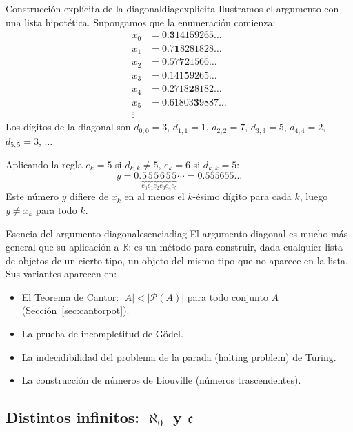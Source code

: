 \begin{ejemplo}{Construcción explícita de la diagonal}{diagexplicita}
Ilustramos el argumento con una lista hipotética. Supongamos que la enumeración comienza:
\begin{align*}
  x_0 &= 0.\mathbf{3}14159265\ldots \\
  x_1 &= 0.7\mathbf{1}8281828\ldots \\
  x_2 &= 0.57\mathbf{7}21566\ldots \\
  x_3 &= 0.141\mathbf{5}9265\ldots \\
  x_4 &= 0.2718\mathbf{2}8182\ldots \\
  x_5 &= 0.61803\mathbf{3}9887\ldots \\
  \vdots
\end{align*}
Los dígitos de la diagonal son $d_{0,0} = 3$, $d_{1,1} = 1$, $d_{2,2} = 7$, $d_{3,3} = 5$, $d_{4,4} = 2$, $d_{5,5} = 3$, $\ldots$

Aplicando la regla $e_k = 5$ si $d_{k,k} \neq 5$, $e_k = 6$ si $d_{k,k} = 5$:
\[
  y = 0.\underbrace{5}_{e_0}\underbrace{5}_{e_1}\underbrace{5}_{e_2}\underbrace{6}_{e_3}\underbrace{5}_{e_4}\underbrace{5}_{e_5}\cdots = 0.555655\ldots
\]
Este número $y$ difiere de $x_k$ en al menos el $k$-ésimo dígito para cada $k$, luego $y \neq x_k$ para todo $k$.
\end{ejemplo}

\begin{observacion}{Esencia del argumento diagonal}{esenciadiag}
El argumento diagonal es mucho más general que su aplicación a $\mathbb{R}$: es un método para construir, dada cualquier lista de objetos de un cierto tipo, un objeto del mismo tipo que no aparece en la lista. Sus variantes aparecen en:
\begin{itemize}[leftmargin=2em]
  \item El Teorema de Cantor: $|A| < |\mathcal{P}(A)|$ para todo conjunto $A$ (Sección~\ref{sec:cantorpot}).
  \item La prueba de incompletitud de Gödel.
  \item La indecidibilidad del problema de la parada (halting problem) de Turing.
  \item La construcción de números de Liouville (números trascendentes).
\end{itemize}
\end{observacion}

\subsection{Distintos infinitos: $\aleph_0$ y $\mathfrak{c}$}

